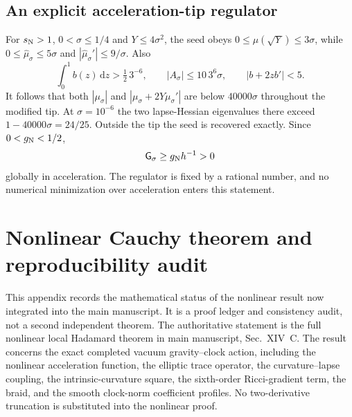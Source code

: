 \documentclass[aps,prd,reprint,onecolumn,notitlepage,nofootinbib,longbibliography,floatfix]{revtex4-2}
\theoremstyle{scstyle}
\theoremstyle{definition}
\theoremstyle{remark}
\newcommand{\dd}{\mathrm{d}}
\begin{document}
\subsection{An explicit acceleration-tip regulator}
For $s_{\rm N}>1$, $0<\sigma\le1/4$ and $Y\le4\sigma^2$, the seed
obeys $0\le\mu(\sqrt Y)\le3\sigma$, while
$0\le\widehat\mu_\sigma\le5\sigma$ and
$|\widehat\mu_\sigma'|\le9/\sigma$. Also
\begin{equation}
 \int_0^1b(z)\,\dd z>\tfrac12\,3^{-6},\qquad
 |A_\sigma|\le10\,3^6\sigma,\qquad
 |b+2zb'|<5.
\end{equation}
It follows that both $|\mu_\sigma|$ and
$|\mu_\sigma+2Y\mu_\sigma'|$ are below $40000\sigma$ throughout
the modified tip. At $\sigma=10^{-6}$ the two lapse-Hessian eigenvalues
there exceed $1-40000\sigma=24/25$. Outside the tip the seed is
recovered exactly. Since $0<g_{\rm N}<1/2$,
\begin{equation}
 \mathsf G_\sigma\ge g_{\rm N}h^{-1}>0
 \label{eq:explicitTipMargin}
\end{equation}
globally in acceleration. The regulator is fixed by a rational number,
and no numerical minimization over acceleration enters this statement.


\section{Nonlinear Cauchy theorem and reproducibility audit}
\label{app:nonlinearAudit}

This appendix records the mathematical status of the nonlinear result now integrated into the main manuscript.  It is a proof ledger and consistency audit, not a second independent theorem.  The authoritative statement is the full nonlinear local Hadamard theorem in main manuscript, Sec.~XIV~C.  The result concerns the exact completed vacuum gravity--clock action, including the nonlinear acceleration function, the elliptic trace operator, the curvature--lapse coupling, the intrinsic-curvature square, the sixth-order Ricci-gradient term, the braid, and the smooth clock-norm coefficient profiles.  No two-derivative truncation is substituted into the nonlinear proof.
\end{document}
